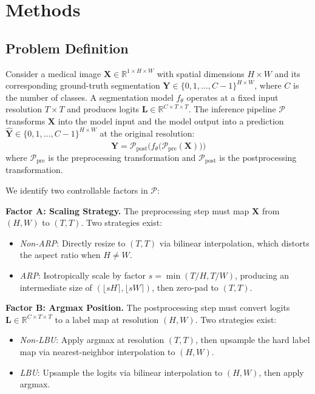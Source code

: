 \documentclass[10pt,twocolumn]{article}
\begin{document}
\section{Methods}
\label{sec:methods}

\subsection{Problem Definition}
\label{sec:problem}

Consider a medical image $\mathbf{X} \in \mathbb{R}^{1 \times H \times W}$ with spatial dimensions $H \times W$ and its corresponding ground-truth segmentation $\mathbf{Y} \in \{0, 1, \ldots, C-1\}^{H \times W}$, where $C$ is the number of classes.
A segmentation model $f_\theta$ operates at a fixed input resolution $T \times T$ and produces logits $\mathbf{L} \in \mathbb{R}^{C \times T \times T}$.
The inference pipeline $\mathcal{P}$ transforms $\mathbf{X}$ into the model input and the model output into a prediction $\hat{\mathbf{Y}} \in \{0, 1, \ldots, C-1\}^{H \times W}$ at the original resolution:
\begin{equation}
    \hat{\mathbf{Y}} = \mathcal{P}_{\text{post}}\Big(f_\theta\big(\mathcal{P}_{\text{pre}}(\mathbf{X})\big)\Big)
\end{equation}
where $\mathcal{P}_{\text{pre}}$ is the preprocessing transformation and $\mathcal{P}_{\text{post}}$ is the postprocessing transformation.

We identify two controllable factors in $\mathcal{P}$:

\textbf{Factor A: Scaling Strategy.}
The preprocessing step must map $\mathbf{X}$ from $(H, W)$ to $(T, T)$.
Two strategies exist:
\begin{itemize}[leftmargin=*]
    \item \textit{Non-ARP}: Directly resize to $(T, T)$ via bilinear interpolation, which distorts the aspect ratio when $H \neq W$.
    \item \textit{ARP}: Isotropically scale by factor $s = \min(T/H, T/W)$, producing an intermediate size of $(\lfloor sH \rceil, \lfloor sW \rceil)$, then zero-pad to $(T, T)$.
\end{itemize}

\textbf{Factor B: Argmax Position.}
The postprocessing step must convert logits $\mathbf{L} \in \mathbb{R}^{C \times T \times T}$ to a label map at resolution $(H, W)$.
Two strategies exist:
\begin{itemize}[leftmargin=*]
    \item \textit{Non-LBU}: Apply argmax at resolution $(T, T)$, then upsample the hard label map via nearest-neighbor interpolation to $(H, W)$.
    \item \textit{LBU}: Upsample the logits via bilinear interpolation to $(H, W)$, then apply argmax.
\end{itemize}
\end{document}
